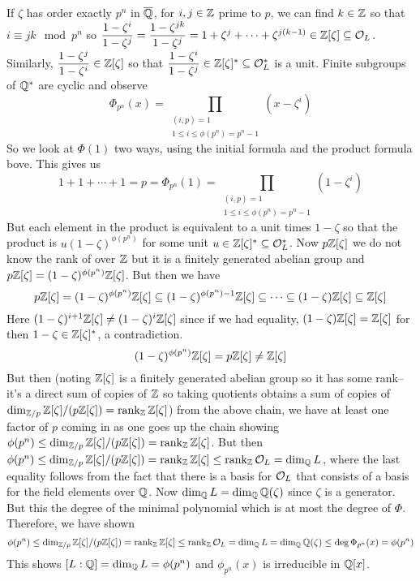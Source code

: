 \pf If $\zeta$ has order exactly $p^n$ in $\overline{\mathbb{Q}}$, for $i,j \in \mathbb{Z}$ prime to $p$, we can find $k \in \mathbb{Z}$ so that $i \equiv jk \mod p^n$ so $\dfrac{1-\zeta^i}{1-\zeta^j}=\dfrac{1-\zeta^{jk}}{1-\zeta^j}=1+\zeta^j+\cdots+\zeta^{j(k-1)} \in \mathbb{Z}[\zeta] \subseteq \mathcal{O}_L$. Similarly, $\dfrac{1-\zeta^j}{1-\zeta^i} \in \mathbb{Z}[\zeta]$ so that $\dfrac{1-\zeta^i}{1-\zeta^j} \in \mathbb{Z}[\zeta]^* \subseteq \mathcal{O}_L^*$ is a unit. Finite subgroups of $\mathbb{Q}^*$ are cyclic and observe
	\[
	\Phi_{p^n}(x)= \prod_{\substack{(i,p)=1 \\ 1 \leq i \leq \phi(p^n)=p^n-1}} (x- \zeta^i)
	\]
So we look at $\Phi(1)$ two ways, using the initial formula and the product formula bove. This gives us
	\[
	1+1+\cdots+1=p=\Phi_{p^n}(1)=\prod_{\substack{(i,p)=1 \\ 1 \leq i \leq \phi(p^n)=p^n-1}} (1- \zeta^i)
	\]
But each element in the product is equivalent to a unit times $1-\zeta$ so that the product is $u(1-\zeta)^{\phi(p^n)}$ for some unit $u \in \mathbb{Z}[\zeta]^* \subseteq \mathcal{O}_L^*$. Now $p\mathbb{Z}[\zeta]$ we do not know the rank of over $\mathbb{Z}$ but it is a finitely generated abelian group and $p\mathbb{Z}[\zeta]=(1-\zeta)^{\phi(p^n)} \mathbb{Z}[\zeta]$. But then we have
	\[
	p\mathbb{Z}[\zeta]=(1-\zeta)^{\phi(p^n)}\mathbb{Z}[\zeta] \subseteq (1-\zeta)^{\phi(p^n)-1} \mathbb{Z}[\zeta] \subseteq \cdots \subseteq (1-\zeta)\mathbb{Z}[\zeta] \subseteq \mathbb{Z}[\zeta]
	\]
Here $(1-\zeta)^{i+1} \mathbb{Z}[\zeta] \neq (1-\zeta)^i \mathbb{Z}[\zeta]$ since if we had equality, $(1-\zeta)\mathbb{Z}[\zeta]=\mathbb{Z}[\zeta]$ for then $1-\zeta \in \mathbb{Z}[\zeta]^*$, a contradiction. 
	\[
	(1-\zeta)^{\phi(p^n)} \mathbb{Z}[\zeta] = p\mathbb{Z}[\zeta] \neq \mathbb{Z}[\zeta]
	\]
But then (noting $\mathbb{Z}[\zeta]$ is a finitely generated abelian group so it has some rank--it's a direct sum of copies of $\mathbb{Z}$ so taking quotients obtains a sum of copies of $\dim_{\mathbb{Z}/p} \mathbb{Z}[\zeta]/(p\mathbb{Z}[\zeta]) = \operatorname{rank}_{\mathbb{Z}} \mathbb{Z}[\zeta]$) from the above chain, we have at least one factor of $p$ coming in as one goes up the chain showing $\phi(p^n) \leq \dim_{\mathbb{Z}/p} \mathbb{Z}[\zeta]/(p\mathbb{Z}[\zeta]) = \operatorname{rank}_{\mathbb{Z}} \mathbb{Z}[\zeta]$. But  then $\phi(p^n) \leq \dim_{\mathbb{Z}/p} \mathbb{Z}[\zeta]/(p\mathbb{Z}[\zeta]) = \operatorname{rank}_{\mathbb{Z}} \mathbb{Z}[\zeta] \leq \operatorname{rank}_{\mathbb{Z}} \mathcal{O}_L= \dim_{\mathbb{Q}} L$, where the last equality follows from the fact that there is a basis for $\mathcal{O}_L$ that consists of a basis for the field elements over $\mathbb{Q}$. Now $\dim_{\mathbb{Q}} L = \dim_{\mathbb{Q}} \mathbb{Q}(\zeta)$ since $\zeta$ is a generator. But this the degree of the minimal polynomial which is at most the degree of $\Phi$. Therefore, we have shown
	\[
	\phi(p^n) \leq \dim_{\mathbb{Z}/p} \mathbb{Z}[\zeta]/(p\mathbb{Z}[\zeta]) = \operatorname{rank}_{\mathbb{Z}} \mathbb{Z}[\zeta] \leq \operatorname{rank}_{\mathbb{Z}} \mathcal{O}_L= \dim_{\mathbb{Q}} L = \dim_{\mathbb{Q}} \mathbb{Q}(\zeta) \leq \deg \Phi_{p^n}(x)=\phi(p^n)
	\]
This shows $[L:\mathbb{Q}]=\dim_{\mathbb{Q}} L= \phi(p^n)$ and $\phi_{p^n}(x)$ is irreducible in $\mathbb{Q}[x]$. 

